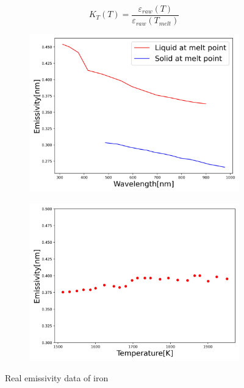 \begin{equation}
  \label{eq: emi_KT_iron}
  K_{T}(T) = \frac{\varepsilon_{raw}(T)}{\varepsilon_{raw}(T_{melt})} 
\end{equation}



\begin{figure}[htbp]
  \centering
  \begin{subfigure}{0.49\textwidth}
    \centering
    \includegraphics[width=\textwidth]{figures/emissivity_wl_iron.jpg}
    \label{fig: emissivity_wl_iron}
  \end{subfigure}
  \begin{subfigure}{0.49\textwidth}
    \centering
    \includegraphics[width=\textwidth]{figures/emissivity_temp_iron.jpg}
    \label{fig: emissivity_temp_iron}
  \end{subfigure}
  \caption{Real emissivity data of iron}
  \label{fig: emissivity_iron_raw}
\end{figure}


